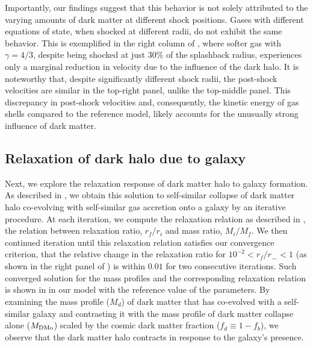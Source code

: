 Importantly, our findings suggest that this behavior is not solely attributed to the varying amounts of dark matter at different shock positions. Gases with different equations of state, when shocked at different radii, do not exhibit the same behavior. This is exemplified in the right column of , where softer gas with $\gamma=4/3$, despite being shocked at just $30\%$ of the splashback radius, experiences only a marginal reduction in velocity due to the influence of the dark halo. It is noteworthy that, despite significantly different shock radii, the post-shock velocities are similar in the top-right panel, unlike the top-middle panel. This discrepancy in post-shock velocities and, consequently, the kinetic energy of gas shells compared to the reference model, likely accounts for the unusually strong influence of dark matter.




\subsection{Relaxation of dark halo due to galaxy}
Next, we explore the relaxation response of dark matter halo to galaxy formation. As described in , we obtain this solution to self-similar collapse of dark matter halo co-evolving with self-similar gas accretion onto a galaxy by an iterative procedure. At each iteration, we compute the relaxation relation as described in , the relation between relaxation ratio, $r_f/r_i$ and mass ratio, $M_i/M_f$. We then continued iteration until this relaxation relation satisfies our convergence criterion, that the relative change in the relaxation ratio for $10^{-2}<r_f/r_{\smallfrown}<1$ (as shown in the right panel of ) is within $0.01$ for two consecutive iterations. Such converged solution for the mass profiles and the corresponding relaxation relation is shown in  in our model with the reference value of the parameters. By examining the mass profile ($M_d$) of dark matter that has co-evolved with a self-similar galaxy and contrasting it with the mass profile of dark matter collapse alone ($M_{\rm DMo}$) scaled by the cosmic dark matter fraction ($f_d \equiv 1-f_b$), we observe that the dark matter halo contracts in response to the galaxy's presence. 

